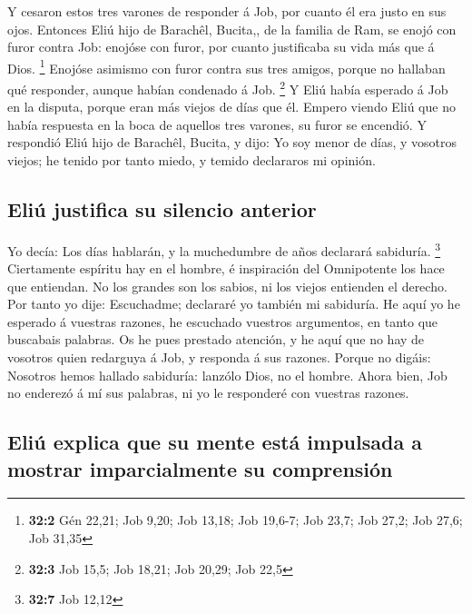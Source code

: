  Y cesaron estos tres varones de responder á Job, por
cuanto él era justo en sus ojos.  Entonces Eliú hijo de
Barachêl, Bucita,, de la familia de Ram, se enojó con furor contra Job:
enojóse con furor, por cuanto justificaba su vida más que á Dios.
\footnote{\textbf{32:2} Gén 22,21; Job 9,20; Job 13,18; Job 19,6-7; Job
  23,7; Job 27,2; Job 27,6; Job 31,35}  Enojóse asimismo
con furor contra sus tres amigos, porque no hallaban qué responder,
aunque habían condenado á Job. \footnote{\textbf{32:3} Job 15,5; Job
  18,21; Job 20,29; Job 22,5}  Y Eliú había esperado á Job
en la disputa, porque eran más viejos de días que él. 
Empero viendo Eliú que no había respuesta en la boca de aquellos tres
varones, su furor se encendió.  Y respondió Eliú hijo de
Barachêl, Bucita, y dijo: Yo soy menor de días, y vosotros viejos; he
tenido por tanto miedo, y temido declararos mi opinión.

\hypertarget{eliuxfa-justifica-su-silencio-anterior}{%
\subsection{Eliú justifica su silencio
anterior}\label{eliuxfa-justifica-su-silencio-anterior}}

 Yo decía: Los días hablarán, y la muchedumbre de años
declarará sabiduría. \footnote{\textbf{32:7} Job 12,12} 
Ciertamente espíritu hay en el hombre, é inspiración del Omnipotente los
hace que entiendan.  No los grandes son los sabios, ni los
viejos entienden el derecho.  Por tanto yo dije:
Escuchadme; declararé yo también mi sabiduría.  He aquí
yo he esperado á vuestras razones, he escuchado vuestros argumentos, en
tanto que buscabais palabras.  Os he pues prestado
atención, y he aquí que no hay de vosotros quien redarguya á Job, y
responda á sus razones.  Porque no digáis: Nosotros hemos
hallado sabiduría: lanzólo Dios, no el hombre.  Ahora
bien, Job no enderezó á mí sus palabras, ni yo le responderé con
vuestras razones.

\hypertarget{eliuxfa-explica-que-su-mente-estuxe1-impulsada-a-mostrar-imparcialmente-su-comprensiuxf3n}{%
\subsection{Eliú explica que su mente está impulsada a mostrar
imparcialmente su
comprensión}\label{eliuxfa-explica-que-su-mente-estuxe1-impulsada-a-mostrar-imparcialmente-su-comprensiuxf3n}}

